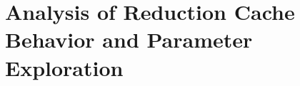 
\chapter[Analysis]{Analysis of Reduction Cache Behavior and Parameter Exploration}
\label{cha:theory}

\minitoc








\clearpage